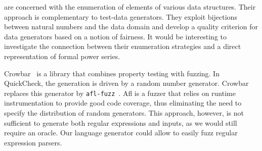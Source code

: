 \citet{DBLP:journals/jfp/NewFFM17} are concerned with the enumeration
of elements of various data structures. Their approach is
complementary to test-data generators. They exploit bijections between
natural numbers and the data domain and develop a quality criterion
for data generators based on a notion of fairness. It would be
interesting to investigate the connection between their enumeration
strategies and a direct representation of formal power series.

Crowbar~\cite{crowbar} is a library that combines property testing
with fuzzing.  In QuickCheck, the generation is driven by a random
number generator. Crowbar replaces this generator by
\texttt{afl-fuzz}~\cite{afl}. Afl is a fuzzer that relies on runtime
instrumentation to provide good code coverage, thus eliminating the
need to specify the distribution of random generators.  This approach,
however, is not sufficient to generate both regular expressions and
inputs, as we would still require an oracle. Our language generator
could allow to easily fuzz regular expression parsers.




